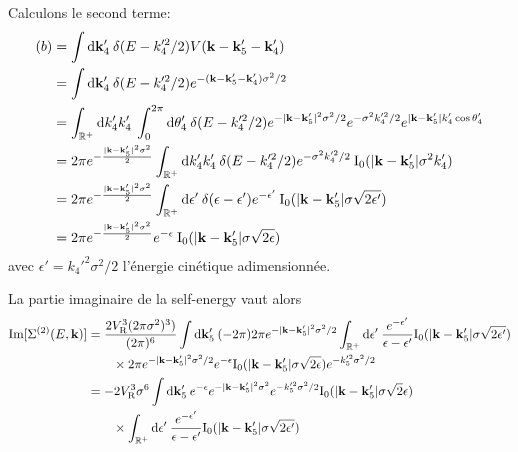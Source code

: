 Calculons le second terme:
\begin{align}
(b)&=\int{\mathop{}\mathopen{}\mathrm{d}\mathbf{k}_{\mathrm{4}}' \: \delta(E-k_{\mathrm{4}}'^2/2) V(\mathbf{k}-\mathbf{k}_{\mathrm{5}}' -\mathbf{k}_{\mathrm{4}}')} \\
&= \int{\mathop{}\mathopen{}\mathrm{d}\mathbf{k}_{\mathrm{4}}' \: \delta(E-k_{\mathrm{4}}'^2/2) e^{-(\mathbf{k}-\mathbf{k}_{\mathrm{5}}'-\mathbf{k}_{\mathrm{4}}')\sigma^2/2}}\\
&=\int_{\mathbb{R}^+}{\mathop{}\mathopen{}\mathrm{d} k_{\mathrm{4}}' k_{\mathrm{4}}' \: \int_0^{2\pi}{\mathop{}\mathopen{}\mathrm{d}\theta_{\mathrm{4}}' \: \delta(E-k_{\mathrm{4}}'^2/2) e^{-|\mathbf{k}-\mathbf{k}_{\mathrm{5}}'|^2\sigma^2/2} e^{-\sigma^2 k_{\mathrm{4}}'^2/2} e^{|\mathbf{k}-\mathbf{k}_{\mathrm{5}}'| k_{\mathrm{4}}' \cos{\theta_{\mathrm{4}}'} } }} \\
&=2\pi e^{-\frac{|\mathbf{k}-\mathbf{k}_{\mathrm{5}}'|^2\sigma^2}{2}} \int_{\mathbb{R}^+}{\mathop{}\mathopen{}\mathrm{d} k_{\mathrm{4}}' k_{\mathrm{4}}' \:\delta(E- k_{\mathrm{4}}'^2/2) e^{-\sigma^2 k_{\mathrm{4}}'^2/2} \: \mathrm{I_0}(|\mathbf{k}-\mathbf{k}_{\mathrm{5}}'| \sigma^2 k_{\mathrm{4}}')}\\
&=2\pi e^{-\frac{|\mathbf{k}-\mathbf{k}_{\mathrm{5}}'|^2\sigma^2}{2}} \int_{\mathbb{R}^+}{\mathop{}\mathopen{}\mathrm{d}\epsilon' \:\delta(\epsilon-\epsilon') e^{-\epsilon'} \: \mathrm{I_0}(|\mathbf{k}-\mathbf{k}_{\mathrm{5}}'| \sigma \sqrt{2\epsilon'})}\\
&=2\pi e^{-\frac{|\mathbf{k}-\mathbf{k}_{\mathrm{5}}'|^2\sigma^2}{2}} e^{-\epsilon} \: \mathrm{I_0}(|\mathbf{k}-\mathbf{k}_{\mathrm{5}}'| \sigma \sqrt{2\epsilon})
\end{align}
avec $\epsilon'=k_{\mathrm{4}}'^2\sigma^2/2$ l'énergie cinétique adimensionnée.

La partie imaginaire de la self-energy vaut alors
\begin{align}
\mathrm{Im}[ \Sigma^{(2)}(E,\mathbf{k})]&= \frac{2 V_{\mathrm{R}}^3 (2\pi\sigma^2)^3)}{(2\pi)^6} \int{\mathop{}\mathopen{}\mathrm{d}\mathbf{k}_{\mathrm{5}}' \: (-2\pi) 2\pi e^{-|\mathbf{k}-\mathbf{k}_{\mathrm{5}}'|^2\sigma^2/2} \int_{\mathbb{R}^+}{\mathop{}\mathopen{}\mathrm{d}\epsilon' \: \frac{e^{-\epsilon'}}{\epsilon-\epsilon'} \mathrm{I_0}(|\mathbf{k}-\mathbf{k}_{\mathrm{5}}'|\sigma\sqrt{2\epsilon'})}}\\
&\nonumber \qquad \times 2\pi e^{-|\mathbf{k}-\mathbf{k}_{\mathrm{5}}'|^2\sigma^2/2} e^{-\epsilon} \mathrm{I_0}(|\mathbf{k}-\mathbf{k}_{\mathrm{5}}'|\sigma \sqrt{2\epsilon}) e^{-k_{\mathrm{5}}'^2\sigma^2/2} \\
 &= -2V_{\mathrm{R}}^3\sigma^6 \int{\mathop{}\mathopen{}\mathrm{d}\mathbf{k}_{\mathrm{5}}' \: e^{-\epsilon} e^{-|\mathbf{k}-\mathbf{k}_{\mathrm{5}}'|^2 \sigma^2} e^{-k_{\mathrm{5}}'^2 \sigma^2/2} \mathrm{I_0}(|\mathbf{k}-\mathbf{k}_{\mathrm{5}}'|\sigma \sqrt{2}\epsilon)} \\
 &\nonumber \qquad \times \int_{\mathbb{R}^+}{\mathop{}\mathopen{}\mathrm{d} \epsilon' \: \frac{e^{-\epsilon'}}{\epsilon-\epsilon'} \mathrm{I_0}(|\mathbf{k}-\mathbf{k}_{\mathrm{5}}'|\sigma \sqrt{2\epsilon'})}
\end{align}



